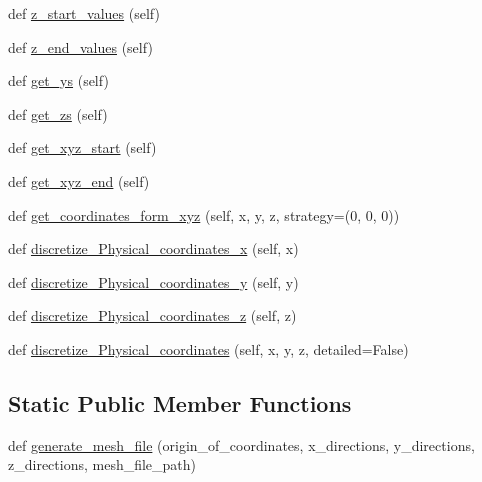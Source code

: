 \begin{DoxyCompactItemize}
\item 
def \hyperlink{classMIS_1_1Muon__Imaging__Algorithm_1_1InvDataTools_1_1MeshTools_1_1MeshTools_afce3bd64c6810a8f281c2d5942860c1e}{z\+\_\+start\+\_\+values} (self)
\item 
def \hyperlink{classMIS_1_1Muon__Imaging__Algorithm_1_1InvDataTools_1_1MeshTools_1_1MeshTools_ad1d64f6c3b84fa444cfd55b240b2c10d}{z\+\_\+end\+\_\+values} (self)
\item 
def \hyperlink{classMIS_1_1Muon__Imaging__Algorithm_1_1InvDataTools_1_1MeshTools_1_1MeshTools_a1270790088c41a4d98050c3f1aa65939}{get\+\_\+ys} (self)
\item 
def \hyperlink{classMIS_1_1Muon__Imaging__Algorithm_1_1InvDataTools_1_1MeshTools_1_1MeshTools_ab17adb99b89f737d4f8f34701a9e8329}{get\+\_\+zs} (self)
\item 
def \hyperlink{classMIS_1_1Muon__Imaging__Algorithm_1_1InvDataTools_1_1MeshTools_1_1MeshTools_a74a70330af1da2391d418f8ae7602d4f}{get\+\_\+xyz\+\_\+start} (self)
\item 
def \hyperlink{classMIS_1_1Muon__Imaging__Algorithm_1_1InvDataTools_1_1MeshTools_1_1MeshTools_a37a52742c19e6c93dd2aafa6d30a5476}{get\+\_\+xyz\+\_\+end} (self)
\item 
def \hyperlink{classMIS_1_1Muon__Imaging__Algorithm_1_1InvDataTools_1_1MeshTools_1_1MeshTools_aed6cf5f1e3ced408db47ddb879e09682}{get\+\_\+coordinates\+\_\+form\+\_\+xyz} (self, x, y, z, strategy=(0, 0, 0))
\item 
def \hyperlink{classMIS_1_1Muon__Imaging__Algorithm_1_1InvDataTools_1_1MeshTools_1_1MeshTools_ad2d6a85fe7a1ae7460b4138dba26cb9d}{discretize\+\_\+\+Physical\+\_\+coordinates\+\_\+x} (self, x)
\item 
def \hyperlink{classMIS_1_1Muon__Imaging__Algorithm_1_1InvDataTools_1_1MeshTools_1_1MeshTools_a143a3dc9ce3b4434af41217d4e49f9d1}{discretize\+\_\+\+Physical\+\_\+coordinates\+\_\+y} (self, y)
\item 
def \hyperlink{classMIS_1_1Muon__Imaging__Algorithm_1_1InvDataTools_1_1MeshTools_1_1MeshTools_a74b499d9267ab02224481df70768e245}{discretize\+\_\+\+Physical\+\_\+coordinates\+\_\+z} (self, z)
\item 
def \hyperlink{classMIS_1_1Muon__Imaging__Algorithm_1_1InvDataTools_1_1MeshTools_1_1MeshTools_aee56188de1d7540091acd6c97c319261}{discretize\+\_\+\+Physical\+\_\+coordinates} (self, x, y, z, detailed=False)
\end{DoxyCompactItemize}
\subsection*{Static Public Member Functions}
\begin{DoxyCompactItemize}
\item 
def \hyperlink{classMIS_1_1Muon__Imaging__Algorithm_1_1InvDataTools_1_1MeshTools_1_1MeshTools_acb3eed0f00b31756f5ae8d86c95e9a91}{generate\+\_\+mesh\+\_\+file} (origin\+\_\+of\+\_\+coordinates, x\+\_\+directions, y\+\_\+directions, z\+\_\+directions, mesh\+\_\+file\+\_\+path)
\end{DoxyCompactItemize}
